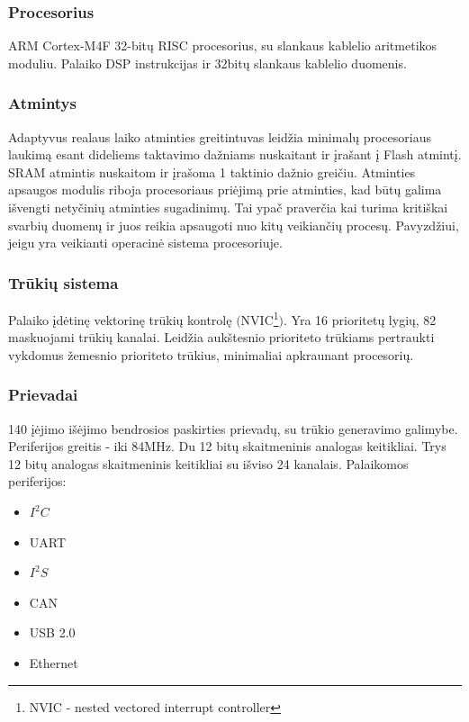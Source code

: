 \documentclass[a4paper, 12pt]{article} %
\begin{document}
\begin{onehalfspacing}
\subsubsection{Procesorius}
ARM Cortex-M4F 32-bit\k{u} RISC procesorius, su slankaus kablelio aritmetikos moduliu. Palaiko DSP instrukcijas ir 32bit\k{u} slankaus kablelio duomenis.      


\subsubsection{Atmintys}
Adaptyvus realaus laiko atminties greitintuvas leid\v{z}ia minimal\k{u} procesoriaus laukim\k{a} esant dideliems taktavimo da\v{z}niams nuskaitant ir \k{i}ra\v{s}ant \k{i} Flash atmint\k{i}. SRAM atmintis nuskaitom ir \k{i}ra\v{s}oma 1 taktinio da\v{z}nio grei\v{c}iu. Atminties apsaugos modulis riboja procesoriaus pri\.ejim\k{a} prie atminties, kad b\=ut\k{u} galima i\v{s}vengti nety\v{c}ini\k{u} atminties sugadinim\k{u}. Tai ypa\v{c} praver\v{c}ia kai turima kriti\v{s}kai svarbi\k{u} duomen\k{u} ir juos reikia apsaugoti nuo kit\k{u} veikian\v{c}i\k{u} proces\k{u}. Pavyzd\v{z}iui, jeigu yra veikianti operacin\.e sistema procesoriuje.


\subsubsection{Tr\=uki\k{u} sistema}
Palaiko \k{i}d\.etin\k{e} vektorin\k{e} tr\=uki\k{u} kontrol\k{e} $($NVIC\footnote{NVIC - nested vectored interrupt controller}$)$.
Yra 16 prioritet\k{u} lygi\k{u}, 82 maskuojami tr\=uki\k{u} kanalai. Leid\v{z}ia auk\v{s}tesnio prioriteto tr\=ukiams pertraukti vykdomus \v{z}emesnio prioriteto tr\=ukius, minimaliai apkraunant procesori\k{u}. 


\subsubsection{Prievadai}    
140 \k{i}\.ejimo i\v{s}\.ejimo bendrosios paskirties prievad\k{u}, su tr\=ukio generavimo galimybe. Periferijos greitis - iki 84MHz. Du 12 bit\k{u} skaitmeninis analogas keitikliai. Trys 12 bit\k{u} analogas skaitmeninis keitikliai su i\v{s}viso 24 kanalais. 
Palaikomos periferijos:
\begin{itemize}
\item $I^2C$
\item UART
\item $I^2S$
\item CAN
\item USB 2.0
\item Ethernet
\end{itemize}


\end{onehalfspacing}
\end{document}
